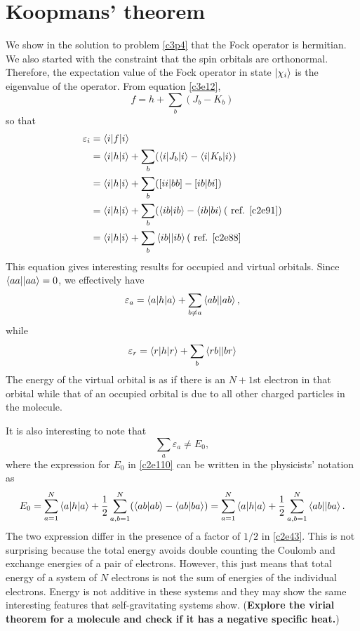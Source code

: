 \section{Koopmans' theorem}\label{c3s3}
We show in the solution to problem \ref{c3p4} that the Fock operator is
hermitian. We also started with the constraint that the spin orbitals are
orthonormal. Therefore, the expectation value of the Fock operator in state
$\ket{\chi_i}$ is the eigenvalue of the operator. From equation \eqref{c3e12},
\[
f = h + \sum_b(J_b - K_b)
\]
so that
\begin{equation}\label{c3e39}
\begin{aligned}
\varepsilon_i &= \braket{i|f|i} \\
 &= \braket{i|h|i} + \sum_b(\braket{i|J_b|i} - \braket{i|K_b|i}) \\
 &= \braket{i|h|i} + \sum_b([ii|bb] - [ib|bi]) \\
 &= \braket{i|h|i} + \sum_b(\braket{ib|ib} - \braket{ib|bi} (\text{ ref. } 
 \eqref{c2e91}) \\
 &= \braket{i|h|i} + \sum_b\braket{ib||ib} (\text{ ref. }\eqref{c2e88}
\end{aligned}
\end{equation}
This equation gives interesting results for occupied and virtual orbitals. Since
$\braket{aa||aa} = 0$, we effectively have
\begin{equation}\label{c3e40}
\varepsilon_a = \braket{a|h|a} + \sum_{b \ne a}\braket{ab||ab},
\end{equation}
while
\begin{equation}\label{c3e41}
\varepsilon_r = \braket{r|h|r} + \sum_b\braket{rb||br}
\end{equation}
The energy of the virtual orbital is as if there is an $N + 1$st electron in
that orbital while that of an occupied orbital is due to all other charged
particles in the molecule.

It is also interesting to note that
\begin{equation}\label{c3e42}
\sum_a\varepsilon_a \ne E_0,
\end{equation}
where the expression for $E_0$ in \eqref{c2e110} can be written in the
physicists' notation as
\begin{equation}\label{c3e43}
E_0 = \sum_{a=1}^N\braket{a|h|a} + \frac{1}{2}\sum_{a,b=1}^N(\braket{ab|ab} -
\braket{ab|ba}) = \sum_{a=1}^N\braket{a|h|a} +
\frac{1}{2}\sum_{a,b=1}^N\braket{ab||ba}.
\end{equation}
The two expression differ in the presence of a factor of $1/2$ in \eqref{c2e43}.
This is not surprising because the total energy avoids double counting the
Coulomb and exchange energies of a pair of electrons. However, this just means
that total energy of a system of $N$ electrons is not the sum of energies of the
individual electrons. Energy is not additive in these systems and they may show
the same interesting features that self-gravitating systems show.
(\textbf{Explore the virial theorem for a molecule and check if it has a
negative specific heat.})

